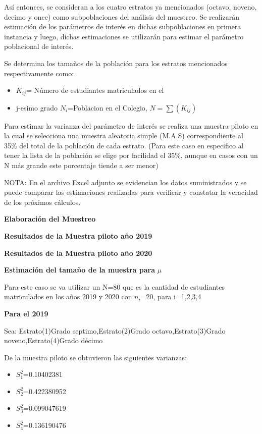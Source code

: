 \documentclass[
]{article}
\providecommand{\tightlist}{%
  \setlength{\itemsep}{0pt}\setlength{\parskip}{0pt}}
\begin{document}
Así entonces, se consideran a los cuatro estratos ya mencionados
(octavo, noveno, decimo y once) como subpoblaciones del análisis del
muestreo. Se realizarán estimación de los parámetros de interés en
dichas subpoblaciones en primera instancia y luego, dichas estimaciones
se utilizarán para estimar el parámetro poblacional de interés.

Se determina los tamaños de la población para los estratos mencionados
respectivamente como:

\begin{itemize}
\tightlist
\item
  \(K_{ij}\)= Número de estudiantes matriculados en el\\
\item
  j-esimo grado \(N_i\)=Poblacion en el Colegio, \(N=\sum(K_{ij})\)
\end{itemize}

Para estimar la varianza del parámetro de interés se realiza una muestra
piloto en la cual se selecciona una muestra aleatoria simple (M.A.S)
correspondiente al 35\% del total de la población de cada estrato. (Para
este caso en especifico al tener la lista de la población se elige por
facilidad el 35\%, aunque en casos con un N más grande este porcentaje
tiende a ser menor)

NOTA: En el archivo Excel adjunto se evidencian los datos suministrados
y se puede comparar las estimaciones realizadas para verificar y
constatar la veracidad de los próximos cálculos.

\begin{center}
\textbf{Elaboración del Muestreo}
\end{center}

\textbf{Resultados de la Muestra piloto año 2019}

\newpage

\textbf{Resultados de la Muestra piloto año 2020}

\textbf{Estimación del tamaño de la muestra para} \(\mu\)

Para este caso se va utilizar un N=80 que es la cantidad de estudiantes
matriculados en los años 2019 y 2020 con \(n_i\)=20, para i=1,2,3,4

\textbf{Para el 2019}

Sea: Estrato(1)Grado septimo,Estrato(2)Grado octavo,Estrato(3)Grado
noveno,Estrato(4)Grado décimo

De la muestra piloto se obtuvieron las siguientes varianzas:

\begin{itemize}
\item
  \(S^2_1\)=0.10402381
\item
  \(S^2_2\)=0.422380952
\item
  \(S^2_3\)=0.099047619
\item
  \(S^2_4\)=0.136190476
\end{itemize}
\end{document}
